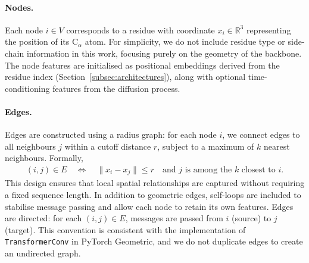 \documentclass[a4paper,12pt]{article}
\begin{document}
\paragraph{Nodes.}
Each node \(i \in V\) corresponds to a residue with coordinate \(x_i \in \mathbb{R}^3\) representing the position of its C\(_\alpha\) atom. For simplicity, we do not include residue type or side-chain information in this work, focusing purely on the geometry of the backbone. The node features are initialised as positional embeddings derived from the residue index (Section~\ref{subsec:architectures}), along with optional time-conditioning features from the diffusion process.

\paragraph{Edges.}
Edges are constructed using a radius graph: for each node \(i\), we connect edges to all neighbours \(j\) within a cutoff distance \(r\), subject to a maximum of \(k\) nearest neighbours. Formally,
\begin{align*}
    (i,j) \in E \quad \Leftrightarrow \quad \|x_i - x_j\| \leq r \quad \text{and } j \text{ is among the } k \text{ closest to } i.
\end{align*}
This design ensures that local spatial relationships are captured without requiring a fixed sequence length. In addition to geometric edges, self-loops are included to stabilise message passing and allow each node to retain its own features. Edges are directed: for each \((i,j) \in E\), messages are passed from \(i\) (source) to \(j\) (target). This convention is consistent with the implementation of \texttt{TransformerConv} in PyTorch Geometric, and we do not duplicate edges to create an undirected graph.
\end{document}
